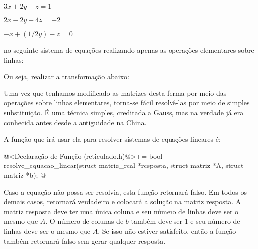 $3x+2y-z=1$

$2x-2y+4z=-2$

$-x+(1/2y)-z=0$

no seguinte sistema de equações realizando apenas as operações
elementares sobre linhas:


Ou seja, realizar a transformação abaixo:


Uma vez que tenhamos modificado as matrizes desta forma por meio das
operações sobre linhas elementares, torna-se fácil resolvê-las por
meio de simples substituição. É uma técnica simples, creditada a
Gauss, mas na verdade já era conhecida antes desde a antiguidade na
China.

A função que irá usar ela para resolver sistemas de equações lineares
é:

\iniciocodigo
@<Declaração de Função (reticulado.h)@>+=
bool resolve_equacao_linear(struct matriz_real *resposta,
                           struct matriz *A, struct matriz *b);
@
\fimcodigo

Caso a equação não possa ser resolvia, esta função retornará falso. Em
todos os demais casos, retornará verdadeiro e colocará a solução na
matriz resposta. A matriz resposta deve ter uma única coluna e seu
número de linhas deve ser o mesmo que $A$. O número de colunas de $b$
também deve ser 1 e seu número de linhas deve ser o mesmo que $A$. Se
isso não estiver satisfeito, então a função também retornará falso sem
gerar qualquer resposta.

